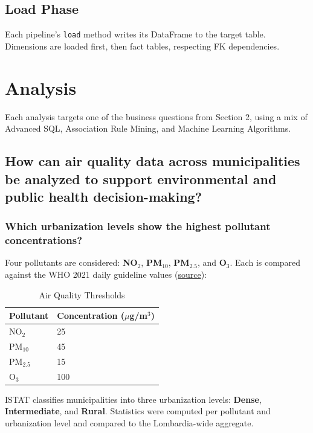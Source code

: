 \documentclass{article}
\begin{document}
	\subsection{Load Phase}

	Each pipeline's \texttt{load} method writes its DataFrame to the target table. Dimensions are loaded first, then fact tables, respecting FK dependencies.

	\newpage
	\section{Analysis}
	
	Each analysis targets one of the business questions from Section 2, using a mix of Advanced SQL, Association Rule Mining, and Machine Learning Algorithms.

	\subsection{How can air quality data across municipalities be analyzed to support environmental and public health decision-making?}
	
	\subsubsection{Which urbanization levels show the highest pollutant concentrations?}
	
	Four pollutants are considered: \textbf{NO$_2$}, \textbf{PM$_{10}$}, \textbf{PM$_{2.5}$}, and \textbf{O$_3$}. Each is compared against the WHO 2021 daily guideline values (\href{https://www.who.int/publications/i/item/9789240034228}{source}):
	
	\begin{table}[H]
		\centering
		\begin{tabular}{ll}
			\hline
			Pollutant & Concentration ($\mu$g/m$^3$) \\
			\hline
			NO$_2$    & 25 \\
			PM$_{10}$   & 45 \\
			PM$_{2.5}$  & 15 \\
			O$_3$     & 100 \\
			\hline
		\end{tabular}
		\caption{Air Quality Thresholds}
	\end{table}
		
	ISTAT classifies municipalities into three urbanization levels: \textbf{Dense}, \textbf{Intermediate}, and \textbf{Rural}. 
	Statistics were computed per pollutant and urbanization level and compared to the Lombardia-wide aggregate.
	
\end{document}
